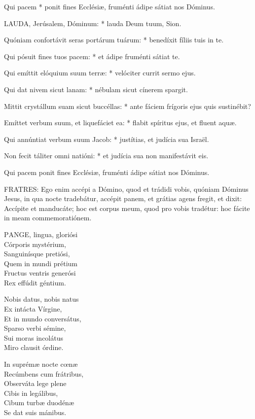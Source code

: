  Qui pacem * ponit fines Ecclésiæ, fruménti ádipe sátiat nos Dóminus.


\lettrine[lines=2]{L}{AUDA}, Jerúsalem, Dóminum: * lauda Deum tuum, Sion.

Quóniam confortávit seras portárum tuárum: * benedíxit fíliis tuis in te.

Qui pósuit fines tuos pacem: * et ádipe fruménti sátiat te.

Qui emíttit elóquium suum terræ: * velóciter currit sermo ejus.

Qui dat nivem sicut lanam: * nébulam sicut cínerem spargit.

Mittit crystállum suam sicut buccéllas: * ante fáciem frígoris ejus quis sustinébit?

Emíttet verbum suum, et liquefáciet ea: * flabit spíritus ejus, et fluent aquæ.

Qui annúntiat verbum suum Jacob: * justítias, et judícia sua Israël.

Non fecit táliter omni natióni: * et judícia sua non manifestávit eis.

 Qui pacem ponit fines Ecclésiæ, fruménti ádipe sátiat nos Dóminus.


\lettrine[lines=2]{F}{RATRES}: Ego enim accépi a Dómino, quod et trádidi vobis, quóniam Dóminus Jesus, in qua nocte tradebátur, accépit panem, et grátias agens fregit, et dixit: Accípite et manducáte; hoc est corpus meum, quod pro vobis tradétur: hoc fácite in meam commemoratiónem.


\lettrine[lines=2]{P}{ANGE}, lingua, gloriósi\\
Córporis mystérium,\\
Sanguinísque pretiósi,\\
Quem in mundi prétium\\
Fructus ventris generósi\\
Rex effúdit géntium.

Nobis datus, nobis natus\\
Ex intácta Vírgine,\\
Et in mundo conversátus,\\
Sparso verbi sémine,\\
Sui moras incolátus\\
Miro clausit órdine.

In suprémæ nocte cœnæ\\
Recúmbens cum frátribus,\\
Observáta lege plene\\
Cibis in legálibus,\\
Cibum turbæ duodénæ\\
Se dat suis mánibus.

